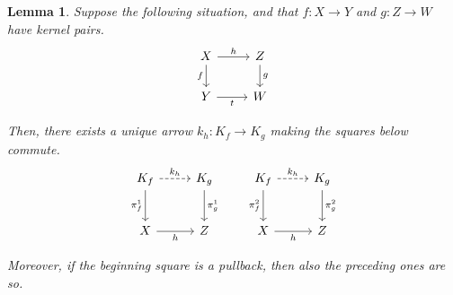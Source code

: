 \documentclass[runningheads,envcountsect]{llncs}
\theoremstyle{plain}
\newtheorem{lemma}[theorem]{Lemma}
\theoremstyle{definition}
\begin{document}
\begin{lemma}\label{lemma:kern_pairs_pres_pullbacks}
    Suppose the following situation, and that $f: X \to Y$ and $g: Z \to W$ have kernel pairs.
    \[
        \begin{tikzcd}
            X \ar[r, "h"] \ar[d, "f"swap] & Z \ar[d, "g"] \\
            Y \ar[r, "t"swap] & W
        \end{tikzcd}
    \]
    
    Then, there exists a unique arrow $k_h: K_f \to K_g$ making the squares below commute.
    \[
        \begin{tikzcd}[row sep = 25 pt, column sep= 25 pt]
            K_f \ar[r, dashed, "{k_h}"] \ar[d, "{\pi_f^1}"swap] & K_g \ar[d, "{\pi_g^1}"] \\
            X \ar[r, "h"swap] & Z 
        \end{tikzcd}
        \qquad
        \begin{tikzcd}[row sep = 25 pt, column sep= 25 pt]
            K_f \ar[r, dashed, "{k_h}"] \ar[d, "{\pi_f^2}"swap] & K_g \ar[d, "{\pi_g^2}"] \\
            X \ar[r, "h"swap] & Z 
        \end{tikzcd}
    \]

    Moreover, if the beginning square is a pullback, then also the preceding ones are so.
\end{lemma}
\end{document}
